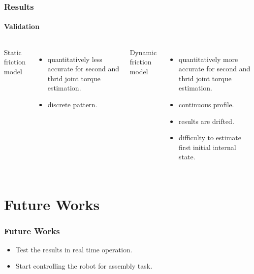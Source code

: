 \documentclass[12pt,english]{beamer}
\begin{document}
  \begin{frame}
    \frametitle{Results}
    \framesubtitle{Validation}
    \begin{columns}
        Static friction model
        \begin{itemize}
          \item quantitatively less accurate for second and thrid joint torque estimation.
          \item discrete pattern.
        \end{itemize}
        Dynamic friction model
        \begin{itemize}
          \item quantitatively more accurate for second and thrid joint torque estimation.
          \item continuous profile.
          \item results are drifted.
          \item difficulty to estimate first initial internal state.
        \end{itemize}
    \end{columns}
  \end{frame}
  \section{Future Works} 
  \begin{frame}
    \frametitle{Future Works}
    \begin{itemize}
      \item Test the results in real time operation.
      \item Start controlling the robot for assembly task.
    \end{itemize}
  \end{frame}
\end{document}

